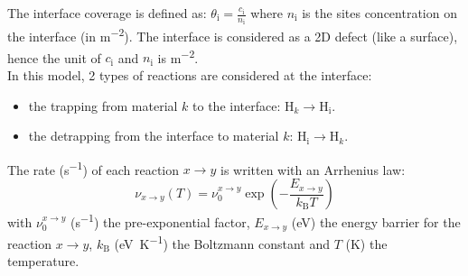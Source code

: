 The interface coverage is defined as: $\theta_\mathrm{i}=\frac{c_\mathrm{i}}{n_\mathrm{i}}$ where $n_\mathrm{i}$ is the sites concentration on the interface (in \si{m^{-2}}).
The interface is considered as a 2D defect (like a surface), hence the unit of $c_\mathrm{i}$ and $n_\mathrm{i}$ is \si{m^{-2}}.\\
\indent In this model, 2 types of reactions are considered at the interface:
\begin{itemize}
    \item the trapping from material $k$ to the interface: $\mathrm{H}_k \rightarrow \mathrm{H_i}$.
    \item the detrapping from the interface to material $k$: $\mathrm{H_i} \rightarrow \mathrm{H}_k$.
\end{itemize}
The rate (\si{s^{-1}}) of each reaction $x\rightarrow y$ is written with an Arrhenius law: 
\begin{equation}
\nu_{x\rightarrow y}(T)=\nu_0^{x\rightarrow y}\exp\left(-\frac{E_{x\rightarrow y}}{k_\mathrm{B}T}\right)
\label{eq:TST}
\end{equation}
with $\nu_0^{x\rightarrow y}$ (\si{s^{-1}}) the pre-exponential factor, $E_{x\rightarrow y}$ (\si{eV}) the energy barrier for the reaction $x\rightarrow y$, $k_\mathrm{B}$ (\si{eV.K^{-1}}) the Boltzmann constant and $T$ (\si{K}) the temperature.\\

